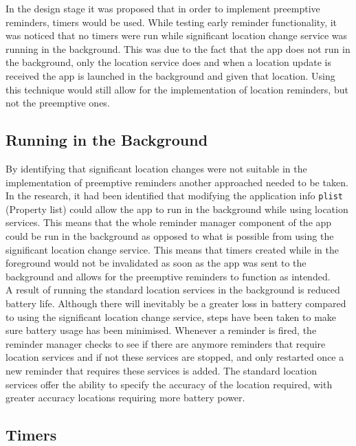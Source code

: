 \documentclass[12pt]{report}
\begin{document}
In the design stage it was proposed that in order to implement preemptive reminders, timers would be used. While testing early reminder functionality, it was noticed that no timers were run while significant location change service was running in the background. This was due to the fact that the app does not run in the background, only the location service does and when a location update is received the app is launched in the background and given that location. Using this technique would still allow for the implementation of location reminders, but not the preemptive ones.

\subsection{Running in the Background}

By identifying that significant location changes were not suitable in the implementation of preemptive reminders another approached needed to be taken. In the research, it had been identified that modifying the application info \texttt{plist} (Property list) could allow the app to run in the background while using location services. This means that the whole reminder manager component of the app could be run in the background as opposed to what is possible from using the significant location change service. This means that timers created while in the foreground would not be invalidated as soon as the app was sent to the background and allows for the preemptive reminders to function as intended.\\

A result of running the standard location services in the background is reduced battery life. Although there will inevitably be a greater loss in battery compared to using the significant location change service, steps have been taken to make sure battery usage has been minimised. Whenever a reminder is fired, the reminder manager checks to see if there are anymore reminders that require location services and if not these services are stopped, and only restarted once a new reminder that requires these services is added. The standard location services offer the ability to specify the accuracy of the location required, with greater accuracy locations requiring more battery power.

\subsection{Timers}
\end{document}
